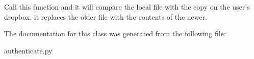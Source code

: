 \begin{DoxyVerb}Call this function and it will compare the local file
with the copy on the user's dropbox. it replaces the older file with the
contents of the newer.
\end{DoxyVerb}
 

The documentation for this class was generated from the following file\-:\begin{DoxyCompactItemize}
\item 
authenticate.\-py\end{DoxyCompactItemize}
